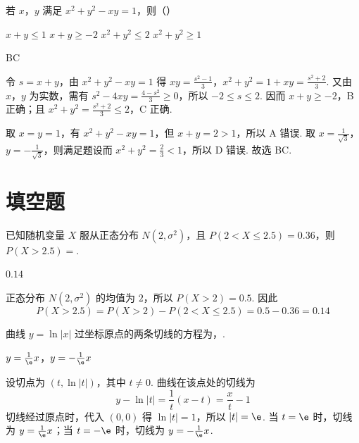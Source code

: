 \begin{problem}
若 \(x\)，\(y\) 满足 \(x^2+y^2-xy=1\)，则（\quad）

\choices
    {\(x+y\le 1\)}
    {\(x+y\ge -2\)}
    {\(x^2+y^2\le 2\)}
    {\(x^2+y^2\ge 1\)}
\end{problem}

\begin{answer}
BC
\end{answer}

\begin{solution}
令 \(s=x+y\)，由 \(x^2+y^2-xy=1\) 得
\(xy=\frac{s^2-1}{3}\)，\(x^2+y^2=1+xy=\frac{s^2+2}{3}\).
又由 \(x\)，\(y\) 为实数，需有
\(s^2-4xy=\frac{4-s^2}{3}\ge0\)，所以 \(-2\le s\le2\). 因而 \(x+y\ge-2\)，B 正确；且
\(x^2+y^2=\frac{s^2+2}{3}\le2\)，C 正确.

取 \(x=y=1\)，有 \(x^2+y^2-xy=1\)，但 \(x+y=2>1\)，所以 A 错误. 取 \(x=\frac1{\sqrt3}\)，\(y=-\frac1{\sqrt3}\)，则满足题设而 \(x^2+y^2=\frac23<1\)，所以 D 错误.
故选 BC.
\end{solution}

\section{填空题}

\begin{problem}
已知随机变量 \(X\) 服从正态分布 \(N(2,\sigma^2)\)，且 \(P(2<X\le 2.5)=0.36\)，则 \(P(X>2.5)=\)\fillinblank{}.
\end{problem}

\begin{answer}
\(0.14\)
\end{answer}

\begin{solution}
正态分布 \(N(2,\sigma^2)\) 的均值为 \(2\)，所以 \(P(X>2)=0.5\). 因此
\[
P(X>2.5)=P(X>2)-P(2<X\le2.5)=0.5-0.36=0.14
\]
\end{solution}


\begin{problem}
曲线 \(y=\ln|x|\) 过坐标原点的两条切线的方程为\fillinblank{}，\fillinblank{}.
\end{problem}

\begin{answer}
\(y=\frac{1}{\e}x\)，\(y=-\frac{1}{\e}x\)
\end{answer}

\begin{solution}
设切点为 \((t,\ln|t|)\)，其中 \(t\ne0\). 曲线在该点处的切线为
\[
y-\ln|t|=\frac1t(x-t)=\frac{x}{t}-1
\]
切线经过原点时，代入 \((0,0)\) 得 \(\ln|t|=1\)，所以 \(|t|=\e\). 当 \(t=\e\) 时，切线为 \(y=\frac1\e x\)；当 \(t=-\e\) 时，切线为 \(y=-\frac1\e x\).
\end{solution}


